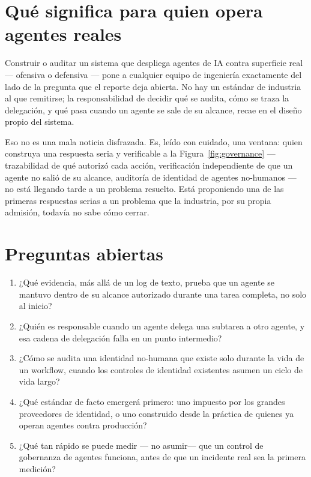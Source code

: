 \documentclass[10pt]{article}
\begin{document}
\section{Qué significa para quien opera agentes reales}

Construir o auditar un sistema que despliega agentes de IA contra superficie real --- ofensiva o defensiva --- pone a cualquier equipo de ingeniería exactamente del lado de la pregunta que el reporte deja abierta. No hay un estándar de industria al que remitirse; la responsabilidad de decidir qué se audita, cómo se traza la delegación, y qué pasa cuando un agente se sale de su alcance, recae en el diseño propio del sistema.

Eso no es una mala noticia disfrazada. Es, leído con cuidado, una ventana: quien construya una respuesta seria y verificable a la Figura~\ref{fig:governance} --- trazabilidad de qué autorizó cada acción, verificación independiente de que un agente no salió de su alcance, auditoría de identidad de agentes no-humanos --- no está llegando tarde a un problema resuelto. Está proponiendo una de las primeras respuestas serias a un problema que la industria, por su propia admisión, todavía no sabe cómo cerrar.

\section{Preguntas abiertas}

\begin{enumerate}
\item ¿Qué evidencia, más allá de un log de texto, prueba que un agente se mantuvo dentro de su alcance autorizado durante una tarea completa, no solo al inicio?
\item ¿Quién es responsable cuando un agente delega una subtarea a otro agente, y esa cadena de delegación falla en un punto intermedio?
\item ¿Cómo se audita una identidad no-humana que existe solo durante la vida de un workflow, cuando los controles de identidad existentes asumen un ciclo de vida largo?
\item ¿Qué estándar de facto emergerá primero: uno impuesto por los grandes proveedores de identidad, o uno construido desde la práctica de quienes ya operan agentes contra producción?
\item ¿Qué tan rápido se puede medir --- no asumir--- que un control de gobernanza de agentes funciona, antes de que un incidente real sea la primera medición?
\end{enumerate}
\end{document}
